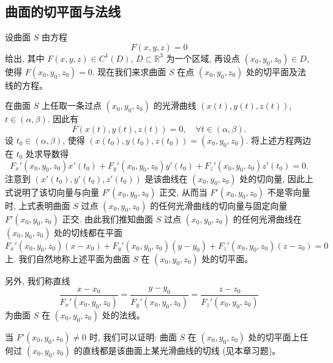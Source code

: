 \documentclass[UTF8, 12pt, fontset=fandol, oneside]{ctexart}
\begin{document}
\subsection{曲面的切平面与法线}

设曲面 $S$ 由方程
\[
  F(x,y,z)=0
\]
给出, 其中 $F(x,y,z)\in C^1(D)$, $D\subset\mathbb R^3$ 为一个区域, 再设点 $(x_0,y_0,z_0)\in D$, 使得 $F(x_0,y_0,z_0)=0$. 现在我们来求曲面 $S$ 在点 $(x_0,y_0,z_0)$ 处的切平面及法线的方程。

在曲面 $S$ 上任取一条过点 $(x_0,y_0,z_0)$ 的光滑曲线 $(x(t),y(t),z(t))$, $t\in(\alpha,\beta)$. 因此有
\[
  F(x(t),y(t),z(t))=0,\quad \forall t\in(\alpha,\beta).
\]
设 $t_0\in(\alpha,\beta)$, 使得 $(x(t_0),y(t_0),z(t_0))=(x_0,y_0,z_0)$. 将上述方程两边在 $t_0$ 处求导数得
\[
  F_x'(x_0,y_0,z_0)x'(t_0)+F_y'(x_0,y_0,z_0)y'(t_0)+F_z'(x_0,y_0,z_0)z'(t_0)=0.
\]
注意到 $(x'(t_0),y'(t_0),z'(t_0))$ 是该曲线在 $(x_0,y_0,z_0)$ 处的切向量, 因此上式说明了该切向量与向量 $F'(x_0,y_0,z_0)$ 正交, 从而当 $F'(x_0,y_0,z_0)$ 不是零向量时, 上式表明曲面 $S$ 过点 $(x_0,y_0,z_0)$ 的任何光滑曲线的切向量与固定向量 $F'(x_0,y_0,z_0)$ 正交. 由此我们推知曲面 $S$ 过点 $(x_0,y_0,z_0)$ 的任何光滑曲线在 $(x_0,y_0,z_0)$ 处的切线都在平面
\[
  F_x'(x_0,y_0,z_0)(x-x_0)+F_y'(x_0,y_0,z_0)(y-y_0)+F_z'(x_0,y_0,z_0)(z-z_0)=0
\]
上. 我们自然地称上述平面为曲面 $S$ 在 $(x_0,y_0,z_0)$ 处的切平面。

另外, 我们称直线
\[
  \frac{x-x_0}{F_x'(x_0,y_0,z_0)}
  =
  \frac{y-y_0}{F_y'(x_0,y_0,z_0)}
  =
  \frac{z-z_0}{F_z'(x_0,y_0,z_0)}
\]
为曲面 $S$ 在 $(x_0,y_0,z_0)$ 处的法线。

当 $F'(x_0,y_0,z_0)\ne0$ 时, 我们可以证明: 曲面 $S$ 在 $(x_0,y_0,z_0)$ 处的切平面上任何过 $(x_0,y_0,z_0)$ 的直线都是该曲面上某光滑曲线的切线 (见本章习题)。
\end{document}
